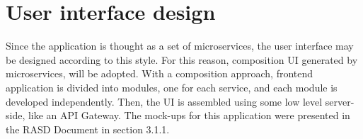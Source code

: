 \section{User interface design}
Since the application is thought as a set of  microservices, the user interface may be designed according to this style. 
For this reason, composition UI generated by microservices, will be adopted. 
With a composition approach, frontend application is divided into modules, one for each service, and each module is developed independently.
Then, the UI is assembled using some low level server-side, like an API Gateway. The mock-ups for this application were presented in the RASD Document in section 3.1.1. 